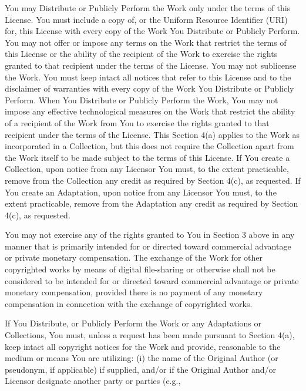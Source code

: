 \begin{doclicense@enumerate}
\item You may Distribute or Publicly Perform the Work only
under the terms of this License. You must include a copy
of, or the Uniform Resource Identifier (URI) for, this
License with every copy of the Work You Distribute or
Publicly Perform. You may not offer or impose any terms
on the Work that restrict the terms of this License or
the ability of the recipient of the Work to exercise the
rights granted to that recipient under the terms of the
License. You may not sublicense the Work. You must keep
intact all notices that refer to this License and to the
disclaimer of warranties with every copy of the Work You
Distribute or Publicly Perform. When You Distribute or
Publicly Perform the Work, You may not impose any
effective technological measures on the Work that
restrict the ability of a recipient of the Work from You
to exercise the rights granted to that recipient under
the terms of the License. This Section 4(a) applies to
the Work as incorporated in a Collection, but this does
not require the Collection apart from the Work itself to
be made subject to the terms of this License. If You
create a Collection, upon notice from any Licensor You
must, to the extent practicable, remove from the
Collection any credit as required by Section 4(c), as
requested. If You create an Adaptation, upon notice from
any Licensor You must, to the extent practicable, remove
from the Adaptation any credit as required by Section
4(c), as requested.
\item You may not exercise any of the rights granted to You
in Section 3 above in any manner that is primarily
intended for or directed toward commercial advantage or
private monetary compensation. The exchange of the Work
for other copyrighted works by means of digital
file-sharing or otherwise shall not be considered to be
intended for or directed toward commercial advantage or
private monetary compensation, provided there is no
payment of any monetary compensation in connection with
the exchange of copyrighted works.
\item If You Distribute, or Publicly Perform the Work or
any Adaptations or Collections, You must, unless a
request has been made pursuant to Section 4(a), keep
intact all copyright notices for the Work and provide,
reasonable to the medium or means You are utilizing: (i)
the name of the Original Author (or pseudonym, if
applicable) if supplied, and/or if the Original Author
and/or Licensor designate another party or parties (e.g.,

\end{doclicense@enumerate}
